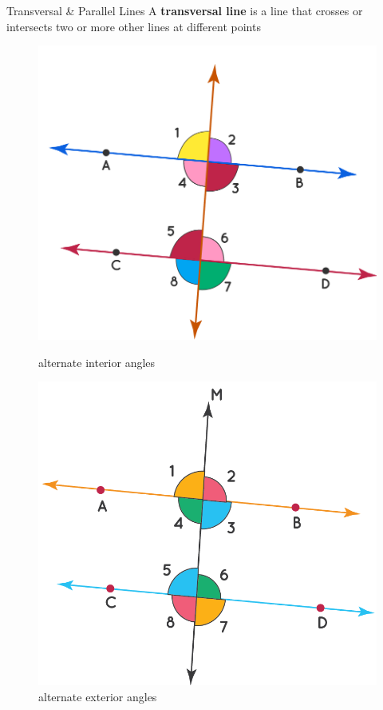 \documentclass{beamer}
\begin{document}
\begin{frame}{Transversal \& Parallel Lines}
    A \textbf{transversal line} is a line that crosses or intersects two or more other lines at different points
    \begin{figure}[h]    
        \begin{minipage}[b]{0.4\textwidth}
        \centering
        \includegraphics[scale=0.15]{alternate_interior_angles.png}
        \caption{alternate interior angles}
    \end{minipage}
    \begin{minipage}[b]{0.4\textwidth}
        \centering
        \includegraphics[scale=0.15]{alternate_exterior_angles.png}
        \caption{alternate exterior angles}
    \end{minipage}
\end{figure}
    
\end{frame}
\end{document}
